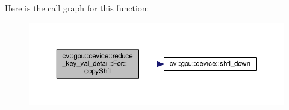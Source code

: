 Here is the call graph for this function\-:\nopagebreak
\begin{figure}[H]
\begin{center}
\leavevmode
\includegraphics[width=350pt]{structcv_1_1gpu_1_1device_1_1reduce__key__val__detail_1_1For_a9abeac6e76418349b7935d8326cc6d1f_cgraph}
\end{center}
\end{figure}



